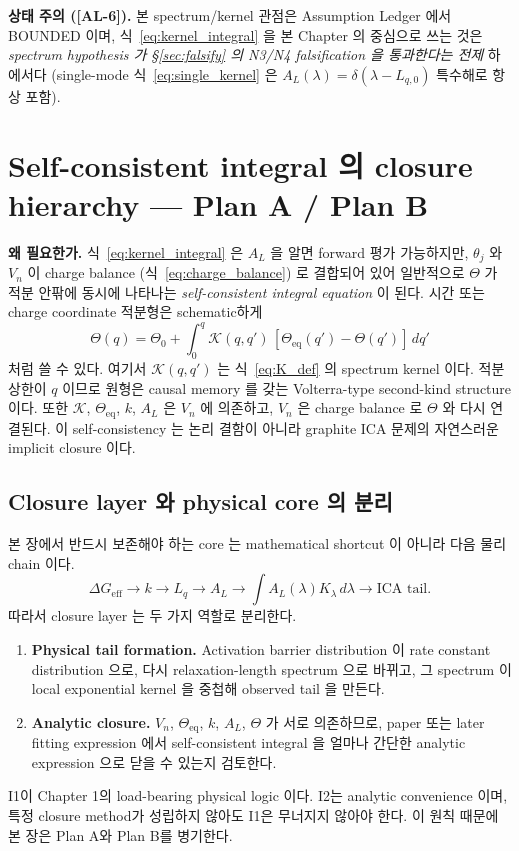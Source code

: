 \documentclass[11pt,a4paper]{article}
\newcommand{\eff}{\mathrm{eff}}
\newcommand{\eq}{\mathrm{eq}}
\newcommand{\AL}[1]{\textsf{[AL-#1]}}
\begin{document}
\textbf{상태 주의 (\AL{6}).} 본 spectrum/kernel 관점은 Assumption Ledger 에서 BOUNDED
이며, 식~\eqref{eq:kernel_integral} 을 본 Chapter 의 중심으로 쓰는 것은 \emph{spectrum
hypothesis 가 \S\ref{sec:falsify} 의 N3/N4 falsification 을 통과한다는 전제} 하에서다
(single-mode 식~\eqref{eq:single_kernel} 은 $A_L(\lambda)=\delta(\lambda-L_{q,0})$ 특수해로 항상 포함).

\section{Self-consistent integral 의 closure hierarchy — Plan A / Plan B}\label{sec:closure}
\textbf{왜 필요한가.} 식~\eqref{eq:kernel_integral} 은 $A_L$ 을 알면 forward 평가 가능하지만,
$\theta_j$ 와 $V_n$ 이 charge balance (식~\eqref{eq:charge_balance}) 로 결합되어 있어 일반적으로
$\Theta$ 가 적분 안팎에 동시에 나타나는 \emph{self-consistent integral equation} 이 된다.
시간 또는 charge coordinate 적분형은 schematic하게
\begin{equation}
\Theta(q)=\Theta_0+\int_0^q \mathcal K(q,q')\,[\Theta_\eq(q')-\Theta(q')]\,dq'
\label{eq:volterra_self}
\end{equation}
처럼 쓸 수 있다. 여기서 $\mathcal K(q,q')$ 는 식~\eqref{eq:K_def} 의 spectrum kernel 이다.
적분 상한이 $q$ 이므로 원형은 causal memory 를 갖는 Volterra-type second-kind structure 이다.
또한 $\mathcal K$, $\Theta_\eq$, $k$, $A_L$ 은 $V_n$ 에 의존하고, $V_n$ 은 charge balance 로
$\Theta$ 와 다시 연결된다. 이 self-consistency 는 논리 결함이 아니라 graphite ICA 문제의
자연스러운 implicit closure 이다.

\subsection{Closure layer 와 physical core 의 분리}\label{sec:closure_core}
본 장에서 반드시 보존해야 하는 core 는 mathematical shortcut 이 아니라 다음 물리 chain 이다.
\[
\Delta G_\eff \rightarrow k \rightarrow L_q \rightarrow A_L \rightarrow
\int A_L(\lambda)K_\lambda\,d\lambda \rightarrow \text{ICA tail}.
\]
따라서 closure layer 는 두 가지 역할로 분리한다.
\begin{enumerate}[label=\textbf{I\arabic*.}]
\item \textbf{Physical tail formation.} Activation barrier distribution 이 rate constant
  distribution 으로, 다시 relaxation-length spectrum 으로 바뀌고, 그 spectrum 이 local
  exponential kernel 을 중첩해 observed tail 을 만든다.
\item \textbf{Analytic closure.} $V_n$, $\Theta_\eq$, $k$, $A_L$, $\Theta$ 가 서로 의존하므로,
  paper 또는 later fitting expression 에서 self-consistent integral 을 얼마나 간단한 analytic
  expression 으로 닫을 수 있는지 검토한다.
\end{enumerate}
I1이 Chapter 1의 load-bearing physical logic 이다. I2는 analytic convenience 이며, 특정 closure
method가 성립하지 않아도 I1은 무너지지 않아야 한다. 이 원칙 때문에 본 장은 Plan A와 Plan B를
병기한다.
\end{document}
